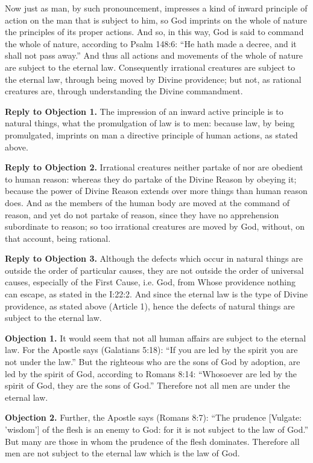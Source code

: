 Now just as man, by such pronouncement, impresses a kind of inward principle of action on the man that is subject to him, so God imprints on the whole of nature the principles of its proper actions. And so, in this way, God is said to command the whole of nature, according to Psalm 148:6: ``He hath made a decree, and it shall not pass away.'' And thus all actions and movements of the whole of nature are subject to the eternal law. Consequently irrational creatures are subject to the eternal law, through being moved by Divine providence; but not, as rational creatures are, through understanding the Divine commandment.

\textbf{Reply to Objection 1.} The impression of an inward active principle is to natural things, what the promulgation of law is to men: because law, by being promulgated, imprints on man a directive principle of human actions, as stated above.

\textbf{Reply to Objection 2.} Irrational creatures neither partake of nor are obedient to human reason: whereas they do partake of the Divine Reason by obeying it; because the power of Divine Reason extends over more things than human reason does. And as the members of the human body are moved at the command of reason, and yet do not partake of reason, since they have no apprehension subordinate to reason; so too irrational creatures are moved by God, without, on that account, being rational.

\textbf{Reply to Objection 3.} Although the defects which occur in natural things are outside the order of particular causes, they are not outside the order of universal causes, especially of the First Cause, i.e. God, from Whose providence nothing can escape, as stated in the I:22:2. And since the eternal law is the type of Divine providence, as stated above (Article 1), hence the defects of natural things are subject to the eternal law.


\textbf{Objection 1.} It would seem that not all human affairs are subject to the eternal law. For the Apostle says (Galatians 5:18): ``If you are led by the spirit you are not under the law.'' But the righteous who are the sons of God by adoption, are led by the spirit of God, according to Romans 8:14: ``Whosoever are led by the spirit of God, they are the sons of God.'' Therefore not all men are under the eternal law.

\textbf{Objection 2.} Further, the Apostle says (Romans 8:7): ``The prudence [Vulgate: 'wisdom'] of the flesh is an enemy to God: for it is not subject to the law of God.'' But many are those in whom the prudence of the flesh dominates. Therefore all men are not subject to the eternal law which is the law of God.

